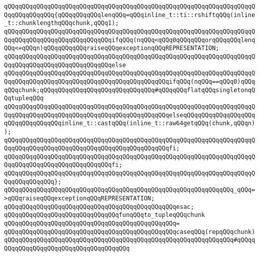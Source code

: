 \verb|qQQqqQQqqQQqqQQqqQQqqQQqqQQqqQQqqQQqqQQqqQQqqQQqqQQqqQQqqQQqqQQqqQQqqQQqqQQqqQQqqQQq{qQQqqQQqqQQqlenqQQq=qQQqinline_t::ti::rshiftqQQq(inline_t::chunklengthqQQqchunk,qQQq1);|\newline
\newline
\verb|qQQqqQQqqQQqqQQqqQQqqQQqqQQqqQQqqQQqqQQqqQQqqQQqqQQqqQQqqQQqqQQqqQQqqQQqqQQqqQQqqQQqqQQqqQQqqQQqqQQqifqQQq(nqQQq<qQQq0qQQqqQQqorqQQqqQQqlenqQQq<=qQQqn)qQQqqQQqqQQqraiseqQQqexceptionqQQqREPRESENTATION;|\newline
\verb|qQQqqQQqqQQqqQQqqQQqqQQqqQQqqQQqqQQqqQQqqQQqqQQqqQQqqQQqqQQqqQQqqQQqqQQqqQQqqQQqqQQqqQQqqQQqqQQqqQQqelse|\newline
\verb|qQQqqQQqqQQqqQQqqQQqqQQqqQQqqQQqqQQqqQQqqQQqqQQqqQQqqQQqqQQqqQQqqQQqqQQqqQQqqQQqqQQqqQQqqQQqqQQqqQQqqQQqqQQqqQQqqQQqifqQQq(nqQQq==qQQq0)qQQqqQQqchunk;qQQqqQQqqQQqqQQqqQQqqQQqqQQqqQQq#qQQqqQQqflatqQQqsingletonqQQqtupleqQQq|\newline
\verb|qQQqqQQqqQQqqQQqqQQqqQQqqQQqqQQqqQQqqQQqqQQqqQQqqQQqqQQqqQQqqQQqqQQqqQQqqQQqqQQqqQQqqQQqqQQqqQQqqQQqqQQqqQQqqQQqqQQqelseqQQqqQQqqQQqqQQqqQQqqQQqqQQqqQQqqQQqinline_t::castqQQq(inline_t::raw64getqQQq(chunk,qQQqn));|\newline
\verb|qQQqqQQqqQQqqQQqqQQqqQQqqQQqqQQqqQQqqQQqqQQqqQQqqQQqqQQqqQQqqQQqqQQqqQQqqQQqqQQqqQQqqQQqqQQqqQQqqQQqqQQqqQQqqQQqqQQqfi;|\newline
\verb|qQQqqQQqqQQqqQQqqQQqqQQqqQQqqQQqqQQqqQQqqQQqqQQqqQQqqQQqqQQqqQQqqQQqqQQqqQQqqQQqqQQqqQQqqQQqqQQqqQQqfi;|\newline
\verb|qQQqqQQqqQQqqQQqqQQqqQQqqQQqqQQqqQQqqQQqqQQqqQQqqQQqqQQqqQQqqQQqqQQqqQQqqQQqqQQqqQQq};|\newline
\newline
\verb|qQQqqQQqqQQqqQQqqQQqqQQqqQQqqQQqqQQqqQQqqQQqqQQqqQQqqQQqqQQqqQQq_qQQq=>qQQqraiseqQQqexceptionqQQqREPRESENTATION;|\newline
\verb|qQQqqQQqqQQqqQQqqQQqqQQqqQQqqQQqqQQqqQQqqQQqqQQqesac;|\newline
\newline
\newline
\verb|qQQqqQQqqQQqqQQqqQQqqQQqqQQqqQQqfunqQQqto_tupleqQQqchunk|\newline
\verb|qQQqqQQqqQQqqQQqqQQqqQQqqQQqqQQqqQQqqQQqqQQqqQQq=|\newline
\verb|qQQqqQQqqQQqqQQqqQQqqQQqqQQqqQQqqQQqqQQqqQQqqQQqcaseqQQq(repqQQqchunk)|\newline
\verb|qQQqqQQqqQQqqQQqqQQqqQQqqQQqqQQqqQQqqQQqqQQqqQQqqQQqqQQqqQQqqQQq#qQQqqQQqqQQqqQQqqQQqqQQqqQQqqQQqqQQqqQQq|\newline
